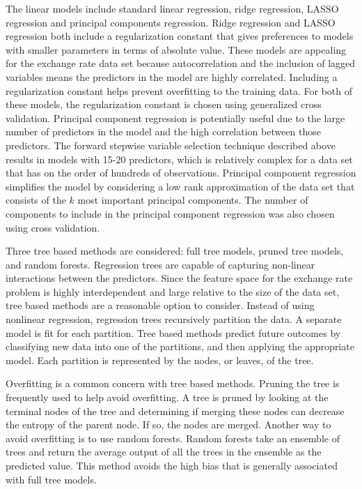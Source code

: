 \documentclass{sig-alternate-05-2015}
\begin{document}
\par{} The linear models include standard linear regression, ridge regression, LASSO regression and principal components regression. Ridge regression and LASSO regression both include a regularization constant that gives preferences to models with smaller parameters in terms of absolute value. These models are appealing for the exchange rate data set because autocorrelation and the inclusion of lagged variables means the predictors in the model are highly correlated. Including a regularization constant helps prevent overfitting to the training data. For both of these models, the regularization constant is chosen using generalized cross validation. Principal component regression is potentially useful due to the large number of predictors in the model and the high correlation between those predictors. The forward stepwise variable selection technique described above results in models with 15-20 predictors, which is relatively complex for a data set that has on the order of hundreds of observations. Principal component regression simplifies the model by considering a low rank approximation of the data set that consists of the $k$ most important principal components. The number of components to include in the principal component regression was also chosen using cross validation. 

\par{} Three tree based methods are considered: full tree models, pruned tree models, and random forests. Regression trees are capable of capturing non-linear interactions between the predictors. Since the feature space for the exchange rate problem is highly interdependent and large relative to the size of the data set, tree based methods are a reasonable option to consider. Instead of using nonlinear regression, regression trees recursively partition the data. A separate model is fit for each partition. Tree based methods predict future outcomes by classifying new data into one of the partitions, and then applying the appropriate model. Each partition is represented by the nodes, or leaves, of the tree. 

\par{} Overfitting is a common concern with tree based methods. Pruning the tree is frequently used to help avoid overfitting. A tree is pruned by looking at the terminal nodes of the tree and determining if merging these nodes can decrease the entropy of the parent node. If so, the nodes are merged. Another way to avoid overfitting is to use random forests. Random forests take an ensemble of trees and return the average output of all the trees in the ensemble as the predicted value. This method avoids the high bias that is generally associated with full tree models.
\end{document}

